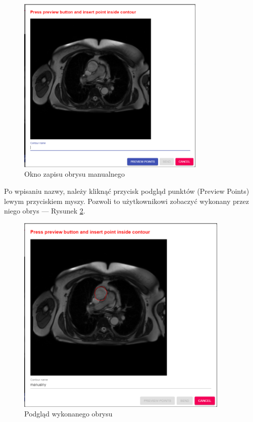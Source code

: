 \documentclass[a4paper,11pt,twoside,openright]{report}
\theoremstyle{definition}
\begin{document}
\begin{enumerate}
\begin{figure}[h!]
	\center
	\includegraphics[width=0.8\textwidth]{6}
	\caption{Okno zapisu obrysu manualnego}
    	\label{fig:6}
\end{figure}

 Po wpisaniu nazwy, należy kliknąć przycisk podgląd punktów (Preview Points)
 lewym przyciskiem myszy. Pozwoli to użytkownikowi zobaczyć wykonany przez niego
 obrys --- Rysunek \ref{fig:7}.
 
 \pagebreak
 
\begin{figure}[h!]
	\center
	\includegraphics[width=0.9\textwidth]{7}
	\caption{Podgląd wykonanego obrysu}
    	\label{fig:7}
\end{figure}


\end{enumerate}
\end{document}
